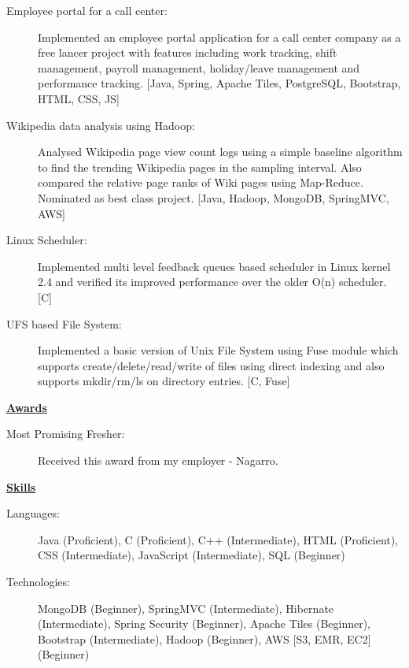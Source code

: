 \documentclass[letterpaper,11pt]{article}
\newcommand{\resheading}[1]{{\large \colorbox{mygrey}{\begin{minipage}{\textwidth}{\textbf{#1 \vphantom{p\^{E}}}}\end{minipage}}}}
\begin{document}
\begin{description}
\item[Employee portal for a call center:] { \footnotesize Implemented an employee portal application for a call center company as a free lancer project with features including work tracking, shift management, payroll management, holiday/leave management and performance tracking. [Java, Spring, Apache Tiles, PostgreSQL, Bootstrap, HTML, CSS, JS] }

\item[Wikipedia data analysis using Hadoop:] { \footnotesize Analysed Wikipedia page view count logs using a simple baseline algorithm to find the trending Wikipedia pages in the sampling interval. Also compared the relative page ranks of Wiki pages using Map-Reduce. Nominated as best class project. [Java, Hadoop, MongoDB, SpringMVC, AWS]}

\item[Linux Scheduler:] { \footnotesize Implemented multi level feedback queues based scheduler in Linux kernel 2.4 and verified its improved performance over the older O(n) scheduler. [C]}

\item[UFS based File System:] { \footnotesize Implemented a basic version of Unix File System using Fuse module which supports create/delete/read/write of files using direct indexing and also supports mkdir/rm/ls on directory entries. [C, Fuse]}

\end{description}

\resheading{\href{http://www.ashish-jindal.com/}{Awards}}

\begin{description}
\item[Most Promising Fresher:] { \footnotesize Received this award from my employer - Nagarro.}

\end{description}

\resheading{\href{http://www.ashish-jindal.com/}{Skills}}
	\begin{description}
		\item[Languages:] { \footnotesize Java (Proficient), C (Proficient), C++ (Intermediate), HTML (Proficient), CSS (Intermediate), JavaScript (Intermediate), SQL (Beginner)
		}
		\item[Technologies:] { \footnotesize
			MongoDB (Beginner), SpringMVC (Intermediate), Hibernate (Intermediate), Spring Security (Beginner), Apache Tiles (Beginner), Bootstrap (Intermediate), Hadoop (Beginner), AWS [S3, EMR, EC2] (Beginner)
		}

	\end{description} %
\end{document}
